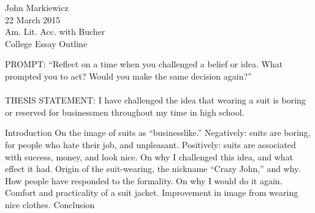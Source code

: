 \documentclass[12pt]{article}
\begin{document}
\begin{raggedleft}
	John Markiewicz \\
	22 March 2015 \\
	Am. Lit. Acc. with Bucher \\
	College Essay Outline \\
\end{raggedleft}
\noindent
PROMPT: ``Reflect on a time when you challenged a belief or 
idea. What prompted you to act? Would you make the same 
decision again?'' \\ \\ 
THESIS STATEMENT: I have challenged the idea that wearing a 
suit is boring or reserved for businessmen throughout my time
in high school.
\begin{outline}[enumerate]
		\1 Introduction
		\1 On the image of suits as ``businesslike.''
			\2 Negatively: suits are boring, for people who hate
			their job, and unpleasant.
			\2 Positively: suits are associated with success, 
			money, and look nice.
		\1 On why I challenged this idea, and what effect it had.
			\2 Origin of the suit-wearing, the nickname ``Crazy
			John,'' and why.
			\2 How people have responded to the formality.
		\1 On why I would do it again.
			\2 Comfort and practicality of a suit jacket.
			\2 Improvement in image from wearing nice clothes.
		\1 Conclusion
\end{outline}
\end{document}
